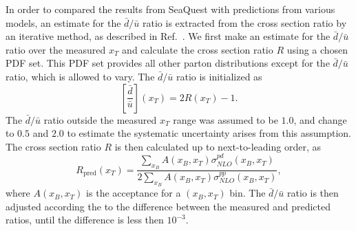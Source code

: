 \documentclass[../main.tex]{subfiles}
\begin{document}
In order to compared the results from SeaQuest with predictions from various models,
an estimate for the $\bar{d}/\bar{u}$ ratio is extracted from the cross section ratio by
an iterative method, as described in Ref.~\cite{dove2021}. 
We first make an estimate for the $\bar{d}/\bar{u}$ ratio over the measured $x_T$
and calculate the cross section ratio $R$ using a chosen PDF set. 
This PDF set provides all other parton distributions except for the $\bar{d}/\bar{u}$ ratio,
which is allowed to vary. The $\bar{d}/\bar{u}$ ratio is initialized as 
\begin{equation}
	\left[\frac{\bar{d}}{\bar{u}}\right]\left(x_T\right) = 2R\left(x_T\right)-1.
\end{equation}
The $\bar{d}/\bar{u}$ ratio outside the measured $x_T$ range was assumed to be $1.0$,
and change to $0.5$ and $2.0$ to estimate the systematic uncertainty arises from this assumption.
The cross section ratio $R$ is then calculated up to next-to-leading order, as 
\begin{equation}
	R_{\mathrm{pred}}\left(x_T\right)  = \frac{\sum_{x_B} A\left(x_B, x_T\right)\sigma^{pd}_{NLO}\left(x_B, x_T\right)}{2\sum_{x_B} A\left(x_B, x_T\right)\sigma^{pp}_{NLO}\left(x_B, x_T\right)},
\end{equation}
where $A\left(x_B,x_T\right)$ is the acceptance for a $\left(x_B, x_T\right)$ bin. 
The $\bar{d}/\bar{u}$ ratio is then adjusted according the to the difference between
the measured and predicted ratios, until the difference is less then $10^{-3}$.
\end{document}
